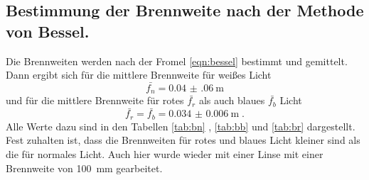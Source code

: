 \subsection{Bestimmung der Brennweite nach der Methode von Bessel.}
Die Brennweiten werden nach der Fromel \eqref{eqn:bessel} bestimmt und
gemittelt. Dann ergibt sich für die mittlere Brennweite für weißes Licht
\begin{equation*}
  \bar{f_n} = \SI{0.04(06)}{\meter}
\end{equation*}
und  für die mittlere Brennweite für rotes $\bar{f_r}$ als auch blaues
$\bar{f_b}$ Licht
\begin{equation*}
  \bar{f_r} = \bar{f_b} = \SI{0.034(6)}{\meter} \; .
\end{equation*}
Alle Werte dazu sind in den Tabellen \ref{tab:bn} , \ref{tab:bb} und \ref{tab:br}
dargestellt. Fest zuhalten ist, dass die Brennweiten für rotes und blaues Licht
kleiner sind als die für normales Licht. Auch hier wurde wieder mit einer Linse
mit einer Brennweite von \SI{100}{\milli\meter} gearbeitet.
